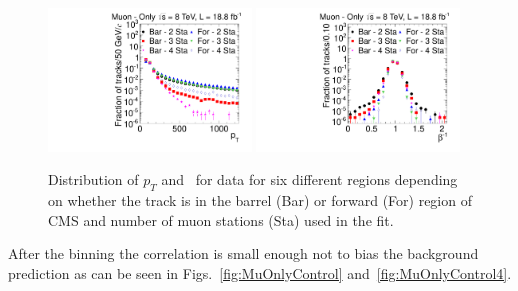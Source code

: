 \begin{figure}
\centering
  \includegraphics[clip=false, trim=0.0cm 0cm 0.0cm 0cm, width=0.48\textwidth]{figures/muonly/Selection_Data8TeV_Pt_Binned_BS}
  \includegraphics[clip=false, trim=0.0cm 0cm 0.0cm 0cm, width=0.48\textwidth]{figures/muonly/Selection_Data8TeV_TOF_Binned_BS}
\caption[Distribution of $p_T$ and \invbeta\ for data in different prediction regions in the \muononly\ analysis]
{Distribution of $p_T$ and \invbeta\ for data for six different regions depending on whether the track is in the barrel (Bar)
or forward (For) region of CMS and number of muon stations (Sta) used in the fit.}
    \label{fig:SelVarBinned}
\end{figure}

After the binning the correlation is small enough not to bias the background prediction as can be seen in Figs.~\ref{fig:MuOnlyControl} and~\ref{fig:MuOnlyControl4}.

